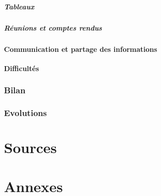 \documentclass{article}
\begin{document}
\subsubsection{Tableaux}

\subsubsection{Réunions et comptes rendus}

\subsection{Communication et partage des informations}

\subsection{Difficultés}

\newpage


\section{Bilan}

\newpage


\section{Evolutions}

\newpage


\part*{Sources}

\newpage


\part*{Annexes}

\newpage
\end{document}
